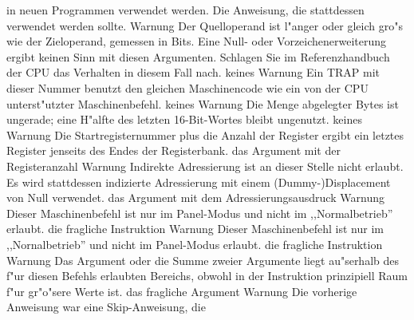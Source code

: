 \documentclass[12pt,a4paper,twoside]{report}
\begin{document}
\begin{description}
{                in neuen Programmen verwendet werden.}
               {Die Anweisung, die stattdessen verwendet werden sollte.}
               {Warnung}
               {Der Quelloperand ist l"anger oder gleich gro"s wie der
                Zieloperand, gemessen in Bits.  Eine Null- oder Vorzeichenerweiterung
                ergibt keinen Sinn mit diesen Argumenten.  Schlagen Sie im 
                Referenzhandbuch der CPU das Verhalten in diesem Fall nach.}
               {keines}
               {Warnung}
               {Ein TRAP mit dieser Nummer benutzt den gleichen Maschinencode
                wie ein von der CPU unterst"utzter Maschinenbefehl.}
               {keines}
               {Warnung}
               {Die Menge abgelegter Bytes ist ungerade; eine H"alfte des letzten
                16-Bit-Wortes bleibt ungenutzt.}
               {keines}
               {Warnung}
               {Die Startregisternummer plus die Anzahl der Register ergibt ein
                letztes Register jenseits des Endes der Registerbank.}
               {das Argument mit der Registeranzahl}
               {Warnung}
               {Indirekte Adressierung ist an dieser Stelle nicht erlaubt.
                Es wird stattdessen indizierte Adressierung mit einem
                (Dummy-)Displacement von Null verwendet.}
               {das Argument mit dem Adressierungsausdruck}
               {Warnung}
               {Dieser Maschinenbefehl ist nur im Panel-Modus und nicht
                im ,,Normalbetrieb'' erlaubt.}
               {die fragliche Instruktion}
               {Warnung}
               {Dieser Maschinenbefehl ist nur im ,,Nornalbetrieb''
                und nicht im Panel-Modus erlaubt.}
               {die fragliche Instruktion}
               {Warnung}
               {Das Argument oder die Summe zweier Argumente
                liegt au"serhalb des f"ur diesen Befehls erlaubten
                Bereichs, obwohl in der Instruktion prinzipiell
                Raum f"ur gr"o"sere Werte ist.}
               {das fragliche Argument}
               {Warnung}
               {Die vorherige Anweisung war eine Skip-Anweisung, die
}
\end{description}
\end{document}
